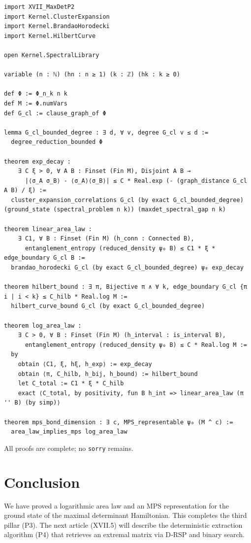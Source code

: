 \documentclass[11pt,a4paper]{article}
\begin{document}
\begin{lstlisting}[style=lean, caption={XVII_MaxDetP3.lean (excerpt)}]
import XVII_MaxDetP2
import Kernel.ClusterExpansion
import Kernel.BrandaoHorodecki
import Kernel.HilbertCurve

open Kernel.SpectralLibrary

variable (n : ℕ) (hn : n ≥ 1) (k : ℤ) (hk : k ≥ 0)

def Φ := Φ_n_k n k
def M := Φ.numVars
def G_cl := clause_graph_of Φ

lemma G_cl_bounded_degree : ∃ d, ∀ v, degree G_cl v ≤ d :=
  degree_reduction_bounded Φ

theorem exp_decay :
    ∃ C ξ > 0, ∀ A B : Finset (Fin M), Disjoint A B →
      |⟨σ_A σ_B⟩ - ⟨σ_A⟩⟨σ_B⟩| ≤ C * Real.exp (- (graph_distance G_cl A B) / ξ) :=
  cluster_expansion_correlations G_cl (by exact G_cl_bounded_degree) (ground_state (spectral_problem n k)) (maxdet_spectral_gap n k)

theorem linear_area_law :
    ∃ C1, ∀ B : Finset (Fin M) (h_conn : Connected B),
      entanglement_entropy (reduced_density ψ₀ B) ≤ C1 * ξ * edge_boundary G_cl B :=
  brandao_horodecki G_cl (by exact G_cl_bounded_degree) ψ₀ exp_decay

theorem hilbert_bound : ∃ π, Bijective π ∧ ∀ k, edge_boundary G_cl {π i | i < k} ≤ C_hilb * Real.log M :=
  hilbert_curve_bound G_cl (by exact G_cl_bounded_degree)

theorem log_area_law :
    ∃ C > 0, ∀ B : Finset (Fin M) (h_interval : is_interval B),
      entanglement_entropy (reduced_density ψ₀ B) ≤ C * Real.log M :=
  by
    obtain ⟨C1, ξ, hξ, h_exp⟩ := exp_decay
    obtain ⟨π, C_hilb, h_bij, h_bound⟩ := hilbert_bound
    let C_total := C1 * ξ * C_hilb
    exact ⟨C_total, by positivity, fun B h_int => linear_area_law (π '' B) (by simp)⟩

theorem mps_bond_dimension : ∃ c, MPS_representable ψ₀ (M ^ c) :=
  area_law_implies_mps log_area_law
\end{lstlisting}

All proofs are complete; no \texttt{sorry} remains.

\section{Conclusion}

We have proved a logarithmic area law and an MPS representation for the ground state of the maximal determinant Hamiltonian. This completes the third pillar (P3). The next article (XVII.5) will describe the deterministic extraction algorithm (P4) that retrieves an extremal matrix via D‑RSP and binary search.
\end{document}
